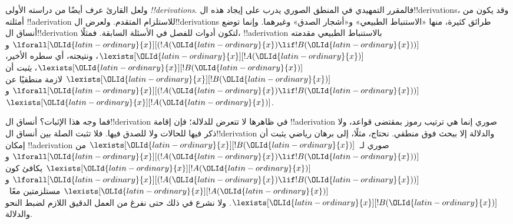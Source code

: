 \documentclass[../../../include/open-logic-section]{subfiles}
\begin{document}
ولعل القارئ عرف أيضًا من دراسته الأولى \emph{!!{derivation}s}.
فالمقرر التمهيدي في المنطق الصوري يدرب على إيجاد هذه
ال!!{derivation}s، وقد يكون من أمثلته !!a{derivation} للاستلزام
المتقدم. ولعرض ال!!{derivation}s طرائق كثيرة، منها «الاستنباط
الطبيعي» و«أشجار الصدق» وغيرهما. وإنما توضع أنساق ال!!{derivation}
لتكون أدوات للفصل في الأسئلة السابقة. فمثلًا، !!a{derivation}
بالاستنباط الطبيعي مقدمته
$\lforall[\OLId{latin-ordinary}{x}][(!A(\OLId{latin-ordinary}{x}) \lif !B(\OLId{latin-ordinary}{x}))]$ و$\lexists[\OLId{latin-ordinary}{x}][!A(\OLId{latin-ordinary}{x})]$،
ونتيجته، أي سطره الأخير، $\lexists[\OLId{latin-ordinary}{x}][!B(\OLId{latin-ordinary}{x})]$، \emph{يثبت} أن
$\lexists[\OLId{latin-ordinary}{x}][!B(\OLId{latin-ordinary}{x})]$ لازمة منطقيًا عن
$\lforall[\OLId{latin-ordinary}{x}][(!A(\OLId{latin-ordinary}{x}) \lif !B(\OLId{latin-ordinary}{x}))]$ و$\lexists[\OLId{latin-ordinary}{x}][!A(\OLId{latin-ordinary}{x})]$.

فما وجه هذا الإثبات؟ أنساق ال!!{derivation} في ظاهرها لا تتعرض
للدلالة؛ فإن إقامة !!a{derivation} صوري إنما هي ترتيب رموز بمقتضى
قواعد، ولا ذكر فيها للحالات ولا للصدق فيها. فلا تثبت الصلة بين
أنساق ال!!{derivation} والدلالة إلا ببحث فوق منطقي. نحتاج، مثلًا،
إلى برهان رياضي يثبت أن إمكان !!a{derivation} صوري
لـ~$\lexists[\OLId{latin-ordinary}{x}][!B(\OLId{latin-ordinary}{x})]$ من
$\lforall[\OLId{latin-ordinary}{x}][(!A(\OLId{latin-ordinary}{x}) \lif !B(\OLId{latin-ordinary}{x}))]$ و$\lexists[\OLId{latin-ordinary}{x}][!A(\OLId{latin-ordinary}{x})]$
يكافئ كون $\lforall[\OLId{latin-ordinary}{x}][(!A(\OLId{latin-ordinary}{x}) \lif !B(\OLId{latin-ordinary}{x}))]$ و
$\lexists[\OLId{latin-ordinary}{x}][!A(\OLId{latin-ordinary}{x})]$ مستلزمتين معًا~$\lexists[\OLId{latin-ordinary}{x}][!B(\OLId{latin-ordinary}{x})]$.
ولا نشرع في ذلك حتى نفرغ من العمل الدقيق اللازم لضبط النحو والدلالة.
\end{document}
